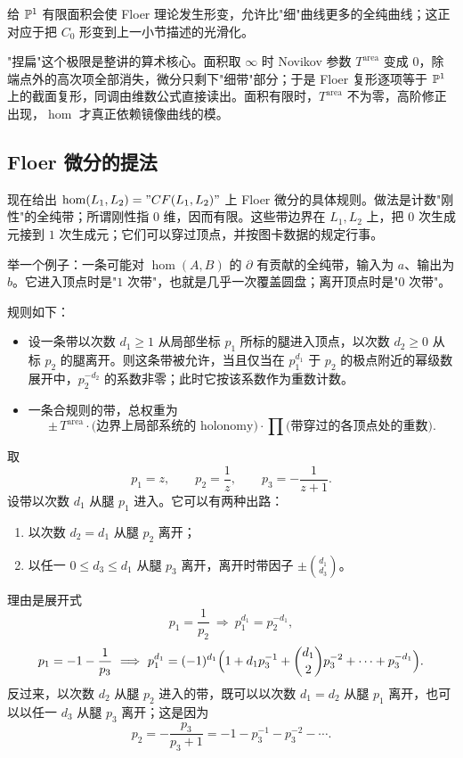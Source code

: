 给 $\mathbb{P}^1$ 有限面积会使 Floer 理论发生形变，允许比"细"曲线更多的全纯曲线；这正对应于把 $C_0$ 形变到上一小节描述的光滑化。

\begin{remark}
"捏扁"这个极限是整讲的算术核心。面积取 $\infty$ 时 Novikov 参数 $T^{\mathrm{area}}$ 变成 $0$，除端点外的高次项全部消失，微分只剩下"细带"部分；于是 Floer 复形逐项等于 $\mathbb{P}^1$ 上的截面复形，同调由维数公式直接读出。面积有限时，$T^{\mathrm{area}}$ 不为零，高阶修正出现，$\hom$ 才真正依赖镜像曲线的模。
\end{remark}

\subsection{Floer 微分的提法}

现在给出 $\hom(L_1,L_2)="CF(L_1,L_2)"$ 上 Floer 微分的具体规则。做法是计数"刚性"的全纯带；所谓刚性指 $0$ 维，因而有限。这些带边界在 $L_1,L_2$ 上，把 $0$ 次生成元接到 $1$ 次生成元；它们可以穿过顶点，并按图卡数据的规定行事。

举一个例子：一条可能对 $\hom(A,B)$ 的 $\partial$ 有贡献的全纯带，输入为 $a$、输出为 $b$。它进入顶点时是"$1$ 次带"，也就是几乎一次覆盖圆盘；离开顶点时是"$0$ 次带"。

规则如下：
\begin{itemize}
  \item 设一条带以次数 $d_1\ge1$ 从局部坐标 $p_1$ 所标的腿进入顶点，以次数 $d_2\ge0$ 从标 $p_2$ 的腿离开。则这条带被允许，当且仅当在 $p_1^{d_1}$ 于 $p_2$ 的极点附近的幂级数展开中，$p_2^{-d_2}$ 的系数非零；此时它按该系数作为重数计数。
  \item 一条合规则的带，总权重为
  \[
  \pm\,T^{\mathrm{area}}\cdot\bigl(\text{边界上局部系统的 holonomy}\bigr)
  \cdot\prod\bigl(\text{带穿过的各顶点处的重数}\bigr).
  \]
\end{itemize}

\begin{example}\label{ex:rule}
取
\[
p_1=z,\qquad p_2=\frac{1}{z},\qquad p_3=-\frac{1}{z+1}.
\]
设带以次数 $d_1$ 从腿 $p_1$ 进入。它可以有两种出路：
\begin{enumerate}[label=(\arabic*)]
  \item 以次数 $d_2=d_1$ 从腿 $p_2$ 离开；
  \item 以任一 $0\le d_3\le d_1$ 从腿 $p_3$ 离开，离开时带因子 $\pm\binom{d_1}{d_3}$。
\end{enumerate}
理由是展开式
\[
p_1=\frac{1}{p_2}\ \Longrightarrow\ p_1^{d_1}=p_2^{-d_1},
\]
\[
p_1=-1-\frac{1}{p_3}\ \Longrightarrow\
p_1^{d_1}=(-1)^{d_1}\Bigl(1+d_1p_3^{-1}+\binom{d_1}{2}p_3^{-2}+\cdots+p_3^{-d_1}\Bigr).
\]
反过来，以次数 $d_2$ 从腿 $p_2$ 进入的带，既可以以次数 $d_1=d_2$ 从腿 $p_1$ 离开，也可以以任一 $d_3$ 从腿 $p_3$ 离开；这是因为
\[
p_2=-\frac{p_3}{p_3+1}=-1-p_3^{-1}-p_3^{-2}-\cdots .
\]
\end{example}

